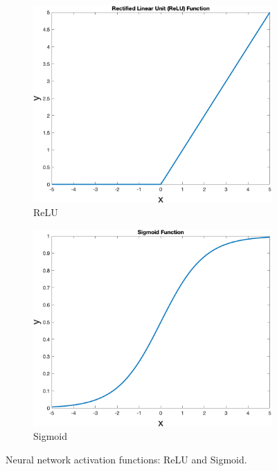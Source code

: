   \begin{figure}[!ht]
        \centering
        \begin{subfigure}[b]{0.30\textwidth}
            \includegraphics[width=\textwidth]{figures/relu}
            \caption{ReLU}
            \label{fig:relu}
        \end{subfigure}
        \hspace{0.1\textwidth}
        \begin{subfigure}[b]{0.3\textwidth}
            \includegraphics[width=\textwidth]{figures/sigmoid}
            \caption{Sigmoid}
            \label{fig:sigmoid}
        \end{subfigure}
        \caption{Neural network activation functions: ReLU and Sigmoid.}
        \label{fig:activationfunctions}
    \end{figure}

